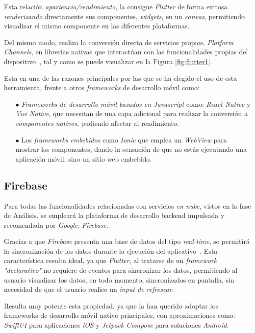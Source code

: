 Esta relación \textit{apariencia/rendimiento}, la consigue \textit{Flutter} de forma exitosa
\textit{renderizando} directamente sus componentes, 
\textit{widgets}, en un \textit{canvas}, permitiendo visualizar el mismo componente en las diferentes plataformas.

Del mismo modo, realiza la conversión directa de servicios propios, \textit{Platform Channels}, en librerías nativas que
interactúan con las funcionalidades propias del dispositivo~\cite{leler2019s}, 
tal y como se puede visualizar en la Figura \ref{fig:flutter1}.

Esta en una de las razones principales por las que se ha elegido el uso de esta herramienta, frente a otros 
\textit{frameworks} de desarrollo móvil como: 

\begin{itemize}
    \item[$\bullet$] \textit{Frameworks de desarrollo móvil basados en Javascript} como: \textit{React Native} y 
    \textit{Vue Native}, que necesitan de una
    capa adicional para realizar la conversión a \textit{componentes nativos}, pudiendo afectar al rendimiento.
    \item[$\bullet$] Los \textit{frameworks embebidos} como
    \textit{Ionic} que emplea un \textit{WebView} para mostrar los componentes, dando la sensación de que no estás ejecutando
    una aplicación móvil, sino un sitio web embebido.
 \end{itemize}

 \subsection{Firebase}
 Para todas las funcionalidades relacionadas con servicios \textit{en nube}, vistos en la fase de Análisis,
 se empleará la plataforma de desarrollo backend impulsada y recomendada por \textit{Google}: \textit{Firebase}.

Gracias a que \textit{Firebase} presenta una base de datos del tipo \textit{real-time}, se permitirá 
la sincronización de los datos durante la ejecución del
aplicativo~\cite{khawas2018application}. Esta característica resulta ideal, ya que
\textit{Flutter}, al tratarse de un \textit{framework "declarativo"} no requiere de eventos para
sincronizar los datos, permitiendo al usuario visualizar los datos, en todo momento, sincronizados en pantalla,
sin necesidad de que el usuario realice un \textit{input de refrescar}.

Resulta muy potente esta propiedad, ya que la han querido adoptar los frameworks de desarrollo móvil nativo principales,
con aproximaciones como: \textit{SwiftUI} para aplicaciones \textit{iOS} y \textit{Jetpack Compose} para soluciones \textit{Android}.

